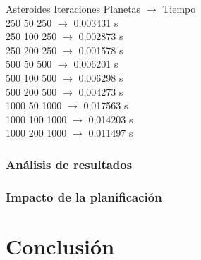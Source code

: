 \documentclass[12pt]{article}
\newcommand\blankpage{%
    \null
    \thispagestyle{empty}%
    \addtocounter{page}{-1}%
    \newpage}
\begin{document}
\begin{enumerate}[label=(\Alph*)]
                \begin{center}
                    \noindent Asteroides Iteraciones Planetas $\rightarrow$ Tiempo \\
                    250 50 250 $\rightarrow$ 0,003431 s \\
                    250 100 250 $\rightarrow$ 0,002873 s \\
                    250 200 250 $\rightarrow$ 0,001578 s \\
                    500 50 500 $\rightarrow$ 0,006201 s \\
                    500 100 500 $\rightarrow$ 0,006298 s \\
                    500 200 500 $\rightarrow$ 0,004273 s \\
                    1000 50 1000 $\rightarrow$ 0,017563 s \\
                    1000 100 1000 $\rightarrow$ 0,014203 s \\
                    1000 200 1000 $\rightarrow$ 0,011497 s \\
                \end{center}
            \end{enumerate}
        \newpage
        \subsubsection{Análisis de resultados}
        \subsubsection{Impacto de la planificación}
    \newpage
    \section{Conclusión}
    \noindent
    \newpage
    \blankpage
\end{document}
